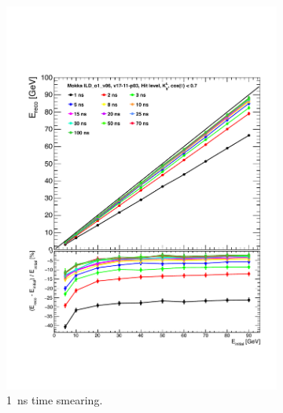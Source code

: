 \begin{figure}[htbp!]
\begin{minipage}{1\textwidth}
\begin{subfigure}[t]{0.5\textwidth}
      \includegraphics[width=1\linewidth]{chap6/fig_TimingILD/1ns_Smearing/Linearity_TimeCuts_Smearing1ns}
      \vspace{-6ex}
      \caption{\SI{1}{\nano\second} time smearing.} \label{fig:Lin1ns}
    \end{subfigure}
  \end{minipage}
  \begin{subfigure}[t]{0.5\textwidth}
    \centering

\end{subfigure}
\end{figure}

